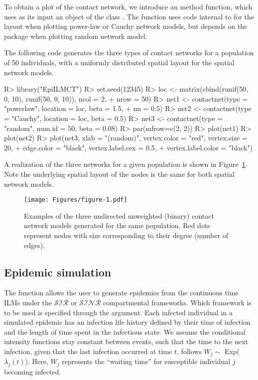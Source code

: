 \documentclass[nojss,shortnames]{jss}
\begin{document}
To obtain a plot of the contact network, we introduce an  method  function, which uses as its input an object of the class . The  function uses code internal to  for the layout when plotting power-law or Cauchy network models, but depends on the package  \citep{igraph} when plotting random network model.

The following code generates the three types of contact networks for a population of 50 individuals, with a uniformly distributed spatial layout for the spatial network models.

\begin{Sinput} 
R> library("EpiILMCT")
R> set.seed(12345)
R> loc <- matrix(cbind(runif(50, 0, 10), runif(50, 0, 10)), ncol = 2,
+    nrow = 50)
R> net1 <- contactnet(type = "powerlaw", location = loc, beta = 1.5,
+    nu = 0.5)
R> net2 <- contactnet(type = "Cauchy",  location = loc, beta = 0.5)
R> net3 <- contactnet(type = "random", num.id = 50, beta = 0.08)
R> par(mfrow=c(2, 2))
R> plot(net1)
R> plot(net2)
R> plot(net3, xlab = "(random)", vertex.color = "red", vertex.size = 20,
+    edge.color = "black", vertex.label.cex = 0.5, 
+    vertex.label.color = "black")
\end{Sinput}

A realization of the three networks for a given population is shown in Figure~\ref{fig.network-plots}. Note the underlying spatial layout of the nodes is the same for both spatial network models.

\begin{figure}[!h]
\begin{center}
\texttt{[image: Figures/figure-1.pdf]}
\caption{Examples of the three undirected unweighted (binary) contact network models generated for the same population. Red dots represent nodes with size corresponding to their degree (number of edges). }
\label{fig.network-plots}
\end{center}
\end{figure}



\subsection{Epidemic simulation}

The function  allows the user to generate epidemics from the continuous time ILMs under the $\mathcal{SIR}$ or $\mathcal{SINR}$ compartmental frameworks. Which framework is to be used is specified through the  argument. Each infected individual in a simulated epidemic has an infection life history defined by their time of infection and the length of time spent in the infectious state. We assume the conditional intensity functions stay constant between events, such that the time to the next infection, given that the last infection occurred at time $t$, follows $W_{j} \sim$ Exp($\lambda_{j}(t)$). Here, $W_{j}$ represents the ``waiting time'' for susceptible individual $j$ becoming infected. 
\end{document}
